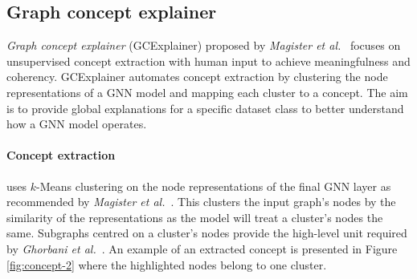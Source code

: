 

\subsection{Graph concept explainer}
\label{sec:GCE}



\emph{Graph concept explainer} (GCExplainer) proposed by \textit{Magister et al.}~\cite{magister2021gcexplainer} focuses on unsupervised concept extraction with human input to achieve meaningfulness and coherency.
GCExplainer automates concept extraction by clustering the node representations of a GNN model and mapping each cluster to a concept.
The aim is to provide global explanations for a specific dataset class to better understand how a GNN model operates.



\paragraph{Concept extraction}
uses $k$-Means clustering on the node representations of the final GNN layer as recommended by \textit{Magister et al.}~\cite{magister2021gcexplainer}.
This clusters the input graph's nodes by the similarity of the representations as the model will treat a cluster's nodes the same.
Subgraphs centred on a cluster's nodes provide the high-level unit required by \textit{Ghorbani et al.}~\cite{ghorbani2019towards}.
An example of an extracted concept is presented in Figure \ref{fig:concept-2} where the highlighted nodes belong to one cluster.



